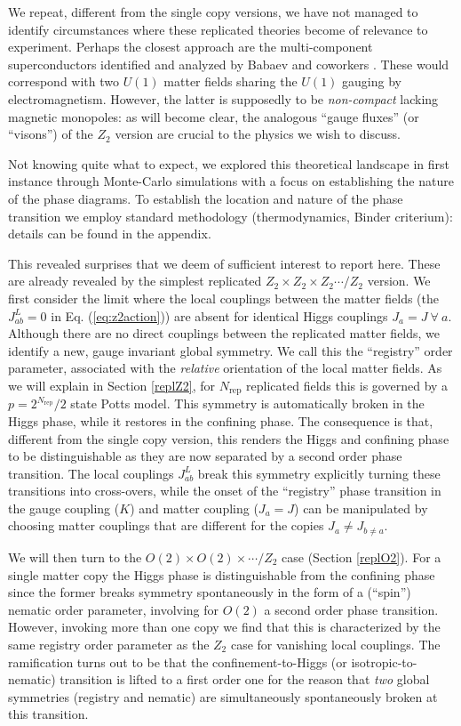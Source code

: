 We repeat, different from the single copy versions, we have not managed to identify circumstances where these replicated theories become of relevance to experiment.  Perhaps the closest approach are the multi-component superconductors identified and analyzed by Babaev and coworkers \cite{Babaev1,Babaev2,Babaev3}. These would correspond with two $U(1)$ matter fields sharing the $U(1)$ gauging by electromagnetism. However, the latter is supposedly to be {\em non-compact} lacking magnetic monopoles: as will become clear, the analogous ``gauge fluxes'' (or ``visons'') of the $Z_2$ version are crucial to the physics we wish to discuss.

Not knowing quite what to expect, we explored this theoretical landscape in first instance through
Monte-Carlo simulations with a focus on establishing the nature of the phase diagrams. To establish the location and nature of the phase transition we employ standard methodology (thermodynamics, Binder criterium): details can be found in the appendix. 

This revealed surprises that we deem of sufficient interest to report here. These are already revealed by the simplest replicated $Z_2 \times Z_2 \times Z_2 \cdots / Z_2$ version. 
We first consider the limit where the local couplings between the matter fields (the $J^L_{ab}=0$ in Eq. (\ref{eq:z2action})) are absent for identical Higgs couplings $J_a=J~\forall~a$.  Although there are no direct couplings between the replicated matter fields, we identify a new, gauge invariant global symmetry. We call this the ``registry'' order parameter, associated with the {\em relative} orientation  of the local matter fields. As we will explain in Section \ref{replZ2}, for $N_\text{rep}$ replicated fields this is governed by a $p = 2^{N_{\text{rep}}} /2$ state Potts model. This symmetry  is automatically broken in the Higgs phase, while it restores in the confining phase. The consequence is that, different from the single copy version, this renders the Higgs and confining phase to be distinguishable as they are now
separated by a second order phase transition. The local couplings $J^L_{ab}$ break this symmetry explicitly turning these transitions into cross-overs, while  the onset of the ``registry'' phase transition in the gauge coupling ($K$) and matter coupling ($J_a=J$) can be manipulated by choosing matter couplings that are different for the copies $J_a\neq J_{b\neq a}$. 

We will then turn to the $O(2) \times O(2) \times \cdots/Z_2$ case (Section \ref{replO2}). For a single matter copy the Higgs phase is distinguishable from the confining phase since the former breaks symmetry spontaneously in the form of a (``spin'') nematic order parameter, involving for $O(2)$ a second order phase transition. However, invoking more than one copy we find that  this is characterized by the same registry order parameter as the $Z_2$ case for vanishing local couplings. The ramification turns out to be that the  confinement-to-Higgs (or isotropic-to-nematic) transition is lifted to a first order one for the reason that {\em two} global symmetries (registry and nematic) are simultaneously spontaneously broken at this transition.

